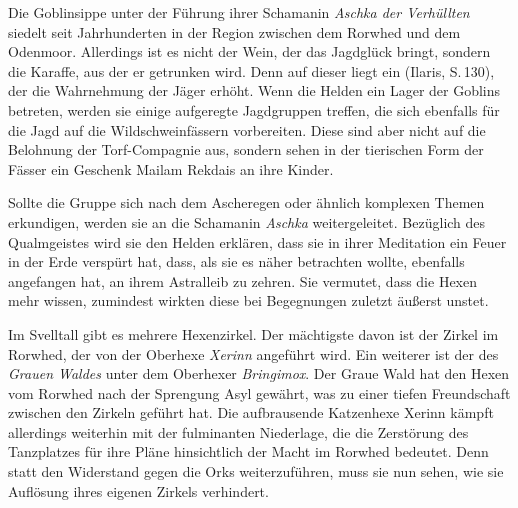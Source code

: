 Die Goblinsippe unter der Führung ihrer Schamanin \emph{Aschka der Verhüllten} siedelt seit Jahrhunderten in der Region zwischen dem Rorwhed und dem Odenmoor.
Allerdings ist es nicht der Wein, der das Jagdglück bringt, sondern die Karaffe, aus der er getrunken wird.
Denn auf dieser liegt ein   (Ilaris, S.\,130), der die Wahrnehmung der Jäger erhöht.
Wenn die Helden ein Lager der Goblins betreten, werden sie einige aufgeregte Jagdgruppen treffen, die sich ebenfalls für die Jagd auf die Wildschweinfässern vorbereiten.
Diese sind aber nicht auf die Belohnung der Torf-Compagnie aus, sondern sehen in der tierischen Form der Fässer ein Geschenk Mailam Rekdais an ihre Kinder.

Sollte die Gruppe sich nach dem Ascheregen oder ähnlich komplexen Themen erkundigen, werden sie an die Schamanin \emph{Aschka} weitergeleitet.
Bezüglich des Qualmgeistes wird sie den Helden erklären, dass sie in ihrer Meditation ein Feuer in der Erde verspürt hat, dass, als sie es näher betrachten wollte, ebenfalls angefangen hat, an ihrem Astralleib zu zehren.
Sie vermutet, dass die Hexen mehr wissen, zumindest wirkten diese bei Begegnungen zuletzt äußerst unstet.


Im Svelltall gibt es mehrere Hexenzirkel. Der mächtigste davon ist der Zirkel im Rorwhed, der von der Oberhexe \emph{Xerinn} angeführt wird.
Ein weiterer ist der des \emph{Grauen Waldes} unter dem Oberhexer \emph{Bringimox}.
Der Graue Wald hat den Hexen vom Rorwhed nach der Sprengung Asyl gewährt, was zu einer tiefen Freundschaft zwischen den Zirkeln geführt hat.
Die aufbrausende Katzenhexe Xerinn kämpft allerdings weiterhin mit der fulminanten Niederlage, die die Zerstörung des Tanzplatzes für ihre Pläne hinsichtlich der Macht im Rorwhed bedeutet.
Denn statt den Widerstand gegen die Orks weiterzuführen, muss sie nun sehen, wie sie Auflösung ihres eigenen Zirkels verhindert.


